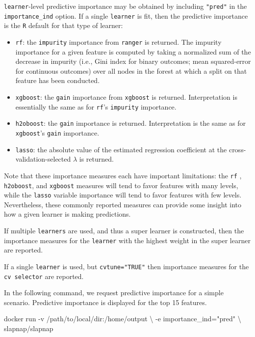 \documentclass[
]{article}
\newenvironment{Shaded}{\begin{snugshade}}{\end{snugshade}}
\newcommand{\ExtensionTok}[1]{#1}
\newcommand{\NormalTok}[1]{#1}
\newcommand{\StringTok}[1]{\textcolor[rgb]{0.31,0.60,0.02}{#1}}
\providecommand{\tightlist}{%
  \setlength{\itemsep}{0pt}\setlength{\parskip}{0pt}}
\begin{document}
\texttt{learner}-level predictive importance may be obtained by including \texttt{"pred"} in the \texttt{importance\_ind} option. If a single \texttt{learner} is fit, then the predictive importance is the \texttt{R} default for that type of learner:

\begin{itemize}
\tightlist
\item
  \texttt{rf}: the \texttt{impurity} importance from \texttt{ranger} \citep{rangerpkg} is returned. The impurity importance for a given feature is computed by taking a normalized sum of the decrease in impurity (i.e., Gini index for binary outcomes; mean squared-error for continuous outcomes) over all nodes in the forest at which a split on that feature has been conducted.
\item
  \texttt{xgboost}: the \texttt{gain} importance from \texttt{xgboost} \citep{xgboostpkg} is returned. Interpretation is essentially the same as for \texttt{rf}'s \texttt{impurity} importance.
\item
  \texttt{h2oboost}: the \texttt{gain} importance \citep{h2opkg} is returned. Interpretation is the same as for \texttt{xgboost}'s \texttt{gain} importance.
\item
  \texttt{lasso}: the absolute value of the estimated regression coefficient at the cross-validation-selected \(\lambda\) is returned.
\end{itemize}

Note that these importance measures each have important limitations: the \texttt{rf} , \texttt{h2oboost}, and \texttt{xgboost} measures will tend to favor features with many levels, while the \texttt{lasso} variable importance will tend to favor features with few levels. Nevertheless, these commonly reported measures can provide some insight into how a given learner is making predictions.

If multiple \texttt{learners} are used, and thus a super learner is constructed, then the importance measures for the \texttt{learner} with the highest weight in the super learner are reported.

If a single \texttt{learner} is used, but \texttt{cvtune="TRUE"} then importance measures for the \texttt{cv\ selector} are reported.

In the following command, we request predictive importance for a simple scenario. Predictive importance is displayed for the top 15 features.

\begin{Shaded}
\begin{Highlighting}[]
\ExtensionTok{docker}\NormalTok{ run {-}v /path/to/local/dir:/home/output \textbackslash{}}
\NormalTok{           {-}e importance\_ind=}\StringTok{"pred"}\NormalTok{ \textbackslash{}}
\NormalTok{           slapnap/slapnap}
\end{Highlighting}
\end{Shaded}
\end{document}
